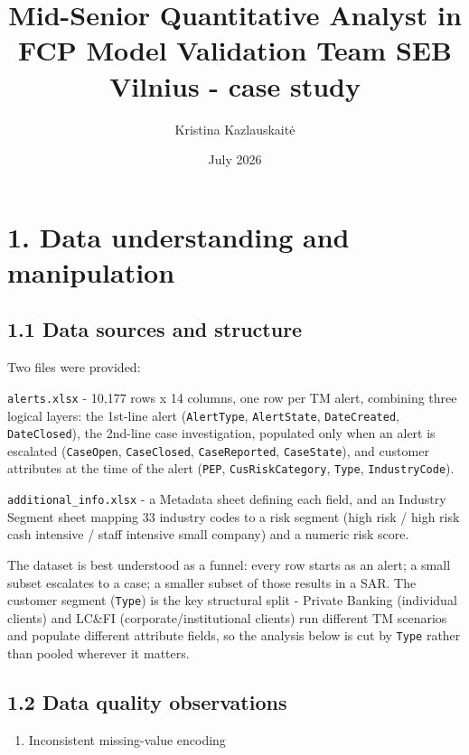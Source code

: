 \documentclass[
]{article}
\title{Mid-Senior Quantitative Analyst in FCP Model Validation Team
\textbar{} SEB Vilnius - case study}
\author{Kristina Kazlauskaitė}
\date{July 2026}
\providecommand{\tightlist}{%
  \setlength{\itemsep}{0pt}\setlength{\parskip}{0pt}}
\begin{document}
\maketitle

{
\setcounter{tocdepth}{2}
\tableofcontents
}
\section{1. Data understanding and
manipulation}\label{data-understanding-and-manipulation}

\subsection{1.1 Data sources and
structure}\label{data-sources-and-structure}

Two files were provided:

\texttt{alerts.xlsx} - 10,177 rows x 14 columns, one row per TM alert,
combining three logical layers: the 1st-line alert (\texttt{AlertType},
\texttt{AlertState}, \texttt{DateCreated}, \texttt{DateClosed}), the
2nd-line case investigation, populated only when an alert is escalated
(\texttt{CaseOpen}, \texttt{CaseClosed}, \texttt{CaseReported},
\texttt{CaseState}), and customer attributes at the time of the alert
(\texttt{PEP}, \texttt{CusRiskCategory}, \texttt{Type},
\texttt{IndustryCode}).

\texttt{additional\_info.xlsx} - a Metadata sheet defining each field,
and an Industry Segment sheet mapping 33 industry codes to a risk
segment (high risk / high risk cash intensive / staff intensive small
company) and a numeric risk score.

The dataset is best understood as a funnel: every row starts as an
alert; a small subset escalates to a case; a smaller subset of those
results in a SAR. The customer segment (\texttt{Type}) is the key
structural split - Private Banking (individual clients) and LC\&FI
(corporate/institutional clients) run different TM scenarios and
populate different attribute fields, so the analysis below is cut by
\texttt{Type} rather than pooled wherever it matters.

\subsection{1.2 Data quality
observations}\label{data-quality-observations}

\begin{enumerate}
\def\labelenumi{(\alph{enumi})}
\tightlist
\item
  Inconsistent missing-value encoding
\end{enumerate}
\end{document}
